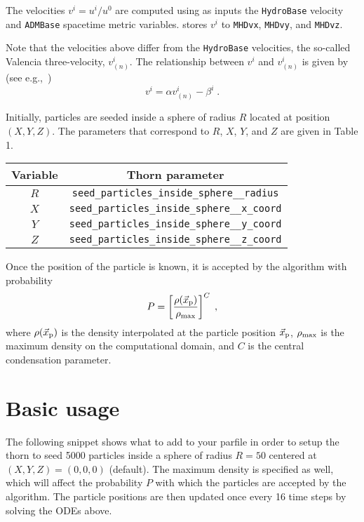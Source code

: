 The velocities $v^{i} = u^{i}/u^{0}$ are computed using as inputs the
\texttt{HydroBase} velocity and \texttt{ADMBase} spacetime metric
variables. \thornname stores $v^{i}$ to \texttt{MHDvx}, \texttt{MHDvy},
and \texttt{MHDvz}.

Note that the velocities above differ from the \texttt{HydroBase}
velocities, the so-called Valencia three-velocity, $v^{i}_{(n)}$. The
relationship between $v^{i}$ and $v^{i}_{(n)}$ is given by (see
e.g.,~\cite{etienne2015illinoisgrmhd})
\begin{equation}
  v^{i} = \alpha v^{i}_{(n)} - \beta^{i}\;.
\end{equation}

Initially, particles are seeded inside a sphere of radius $R$ located at
position $(X,Y,Z)$. The parameters that correspond to $R$, $X$, $Y$, and
$Z$ are given in Table 1.

\begin{table}
  \centering
  \begin{tabular}{c c}
    \hline
    \hline
    Variable & Thorn parameter\\
    \hline
    $R$ & \verb|seed_particles_inside_sphere__radius|\\
    $X$ & \verb|seed_particles_inside_sphere__x_coord|\\
    $Y$ & \verb|seed_particles_inside_sphere__y_coord|\\
    $Z$ & \verb|seed_particles_inside_sphere__z_coord|\\
    \hline
    \hline
  \end{tabular}
\end{table}

Once the position of the particle is known, it is accepted by the
algorithm with probability
\begin{equation}
  P = \left[\frac{\rho(\vec{x}_{\rm p})}{\rho_{\rm max}}\right]^{C}\;,
\end{equation}
where $\rho(\vec{x}_{\rm p})$ is the density interpolated at the
particle position $\vec{x}_{\rm p}$, $\rho_{\rm max}$ is the maximum
density on the computational domain, and $C$ is the central condensation
parameter.

\section{Basic usage}
\label{sec:basic_usage}

The following snippet shows what to add to your parfile in order to
setup the thorn to seed 5000 particles inside a sphere of radius $R=50$
centered at $(X,Y,Z)=(0,0,0)$ (default). The maximum density is
specified as well, which will affect the probability $P$ with which the
particles are accepted by the algorithm. The particle positions are then
updated once every 16 time steps by solving the ODEs above.

